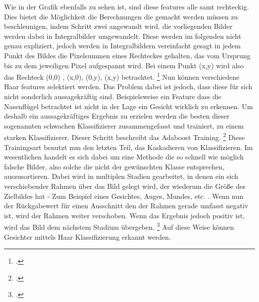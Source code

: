 \documentclass[12pt, a4paper]{report}
\begin{document}
Wie in der Grafik ebenfalls zu sehen ist, sind diese features alle samt rechteckig. Dies bietet die Möglichkeit die Berechnungen die gemacht werden müssen zu beschleunigen, indem Schritt zwei angewandt wird. die vorliegenden Bilder werden dabei in Integralbilder umgewandelt.  Diese werden im folgenden nicht genau expliziert, jedoch werden in Integralbildern vereinfacht gesagt in jedem Punkt des Bildes die Pixelsummen eines Rechteckes gehalten, das vom Ursprung bis zu dem jeweiligen Pixel aufgespannt wird. Bei einem Punkt (x,y) wird also das Rechteck (0,0) , (x,0), (0,y), (x,y) betrachtet.
\footcite[Vgl.][]{integral}
Nun können verschiedene Haar features selektiert werden. Das Problem dabei ist jedoch, dass diese für sich nicht sonderlich aussagekräftig sind. Beispielsweise ein Feature dass die Nasenflügel betrachtet ist nicht in der Lage ein Gesicht wirklich zu erkennen. Um deshalb ein aussagekräftiges Ergebnis zu erzielen werden die besten dieser sogenannten schwachen Klassifizierer zusammengefasst und trainiert,  zu einem starken Klassifizierer. Dieser Schritt beschreibt das Adaboost Training.
\footcite[Vgl.][]{willberger}
Diese Trainingsart benutzt nun den letzten Teil, das Kaskadieren von Klassifizieren. Im wesentlichen handelt es sich dabei um eine Methode die so schnell wie möglich falsche Bilder, also solche die nicht der gewünschten Klasse entsprechen, auszusortieren. Dabei wird in multiplen Stadien gearbeitet, in denen	 ein sich verschiebender Rahmen über das Bild gelegt wird, der wiederum die Größe des Zielbildes hat - Zum Beispiel eines Gesichtes, Auges, Mundes, etc. . Wenn nun der Rückgabewert für einen Ausschnitt den der Rahmen gerade umfasst negativ ist, wird der Rahmen weiter verschoben. Wenn das Ergebnis jedoch positiv ist, wird das Bild dem nächstem Stadium übergeben. 
\footcite[Vgl.][]{willberger}
Auf diese Weise können Gesichter mittels Haar Klassifizierung erkannt werden.
\end{document}
